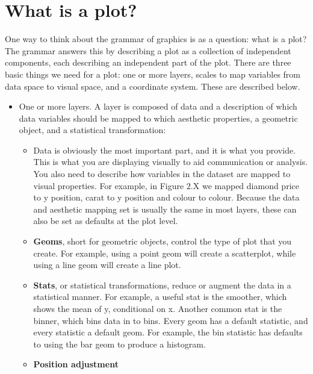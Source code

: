 \section{What is a plot?}
\label{sec:what_is_a_plot}

One way to think about the grammar of graphics is as a question: what is a plot?  The grammar answers this by describing a plot as a collection of independent components, each describing an independent part of the plot.  There are three basic things we need for a plot: one or more layers, scales to map variables from data space to visual space, and a coordinate system.  These are described below.

\begin{itemize}
  \item One or more layers.  A layer is composed of data and a description of which data variables should be mapped to which aesthetic properties, a geometric object, and a statistical transformation:
  
  \begin{itemize}
  	\item Data is obviously the most important part, and it is what you provide.  This is what you are displaying visually to aid communication or analysis.  You also need to describe how variables in the dataset are mapped to visual properties.  For example, in Figure 2.X we mapped diamond price to y position, carat to y position and colour to colour.  Because the data and aesthetic mapping set is usually the same in most layers, these can also be set as defaults at the plot level.
  	
  	\item {\bf Geoms}, short for geometric objects, control the type of plot that you create.  For example, using a point geom will create a scatterplot, while using a line geom will create a line plot.

  	\item {\bf Stats}, or statistical transformations, reduce or augment the data in a statistical manner.  For example, a useful stat is the smoother, which shows the mean of y, conditional on x.  Another common stat is the binner, which bins data in to bins.   Every geom has a default statistic, and every statistic a default geom.  For example, the bin statistic has defaults to using the bar geom to produce a histogram.

  	\item {\bf Position adjustment}
  \end{itemize}


\end{itemize}
